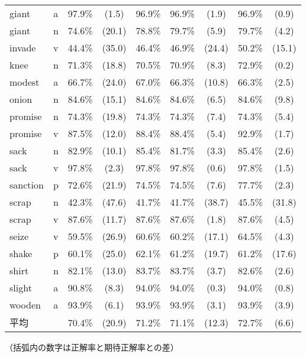 \begin{table*}
\begin{center}
\begin{tabular}{l|c|cc|c|cc|cc}
     giant & a  & 97.9\% & (1.5) & 96.9\%  & 96.9\% & (1.9) & 96.9\% & (0.9) \\
     giant & n  & 74.6\% & (20.1)  & 78.8\%  & 79.7\% & (5.9) & 79.7\% & (4.2) \\
    invade & v  & 44.4\% & (35.0) & 46.4\%  & 46.9\% & (24.4) & 50.2\% & (15.1) \\
      knee & n  & 71.3\% & (18.8) & 70.5\%  & 70.9\% & (8.3) & 72.9\% & (0.2) \\
    modest & a  & 66.7\% & (24.0) & 67.0\%  & 66.3\% & (10.8) & 66.3\% & (2.5) \\
     onion & n  & 84.6\% & (15.1) & 84.6\%  & 84.6\% & (6.5) & 84.6\% & (9.8) \\
   promise & n  & 74.3\% & (19.8) & 74.3\%  & 74.3\% & (7.4) & 74.3\% & (5.4) \\
   promise & v  & 87.5\% & (12.0) & 88.4\% & 88.4\% & (5.4) & 92.9\% & (1.7) \\
      sack & n  & 82.9\% & (10.1) & 85.4\%  & 81.7\% & (3.3) & 85.4\% & (2.6) \\
      sack & v  & 97.8\% & (2.3) & 97.8\%  & 97.8\% & (0.6) & 97.8\% & (1.5) \\
  sanction & p  & 72.6\% & (21.9)  & 74.5\%  & 74.5\% & (7.6) & 77.7\% & (2.3) \\
     scrap & n  & 42.3\% & (47.6) & 41.7\%  & 41.7\% & (38.7) & 45.5\% & (31.8) \\
     scrap & v  & 87.6\% & (11.7) & 87.6\%  & 87.6\% & (1.8) & 87.6\% & (4.5) \\
     seize & v  & 59.5\% & (26.9) & 60.6\%  & 60.2\% & (17.1) & 64.5\% & (4.3) \\
     shake & p  & 60.1\% & (25.0) & 62.1\%  & 61.2\% & (19.7) & 61.2\% & (17.6) \\
     shirt & n  & 82.1\% & (13.0) & 83.7\%  & 83.7\% & (3.7) & 82.6\% & (2.6) \\
    slight & a  & 90.8\% & (8.3) & 94.0\% & 94.0\% & (0.3) & 94.0\% & (0.8) \\
    wooden & a  & 93.9\% & (6.1) & 93.9\% & 93.9\% & (3.1) & 93.9\% & (3.9) \\
\hline
平均 &  & 70.4\% & (20.9)  & 71.2\% & 71.1\% & (12.3) & 72.7\% & (6.6) \\
\hline
\end{tabular}
\end{center}

\vspace{0.5mm}
\begin{flushright}
（括弧内の数字は正解率と期待正解率との差）
\end{flushright}
\end{table*}

